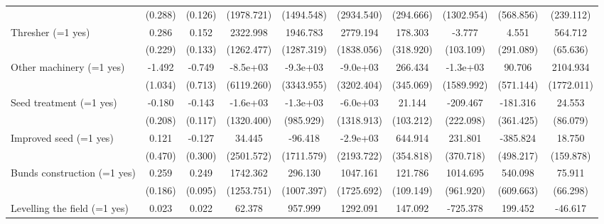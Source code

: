 {\begin{tabular}{l*{9}{c}}
                    &(0.288)         &(0.126)         &(1978.721)         &(1494.548)         &(2934.540)         &(294.666)         &(1302.954)         &(568.856)         &(239.112)         \\
Thresher (=1 yes)   &0.286         &0.152         &2322.998         &1946.783         &2779.194         &178.303         &-3.777         &4.551         &564.712\sym{***}\\
                    &(0.229)         &(0.133)         &(1262.477)         &(1287.319)         &(1838.056)         &(318.920)         &(103.109)         &(291.089)         &(65.636)         \\
Other machinery (=1 yes)&-1.492         &-0.749         &-8.5e+03         &-9.3e+03\sym{**} &-9.0e+03\sym{**} &266.434         &-1.3e+03         &90.706         &2104.934         \\
                    &(1.034)         &(0.713)         &(6119.260)         &(3343.955)         &(3202.404)         &(345.069)         &(1589.992)         &(571.144)         &(1772.011)         \\
Seed treatment (=1 yes)&-0.180         &-0.143         &-1.6e+03         &-1.3e+03         &-6.0e+03\sym{***}&21.144         &-209.467         &-181.316         &24.553         \\
                    &(0.208)         &(0.117)         &(1320.400)         &(985.929)         &(1318.913)         &(103.212)         &(222.098)         &(361.425)         &(86.079)         \\
Improved seed (=1 yes)&0.121         &-0.127         &34.445         &-96.418         &-2.9e+03         &644.914         &231.801         &-385.824         &18.750         \\
                    &(0.470)         &(0.300)         &(2501.572)         &(1711.579)         &(2193.722)         &(354.818)         &(370.718)         &(498.217)         &(159.878)         \\
Bunds construction (=1 yes)&0.259         &0.249\sym{**} &1742.362         &296.130         &1047.161         &121.786         &1014.695         &540.098         &75.911         \\
                    &(0.186)         &(0.095)         &(1253.751)         &(1007.397)         &(1725.692)         &(109.149)         &(961.920)         &(609.663)         &(66.298)         \\
Levelling the field (=1 yes)&0.023         &0.022         &62.378         &957.999         &1292.091         &147.092         &-725.378         &199.452         &-46.617         \\

\end{tabular}}
